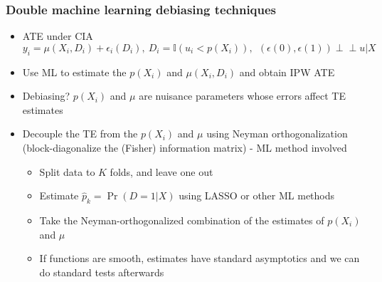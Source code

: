 \documentclass[aspectratio=169]{beamer}
\begin{document}
\begin{frame}
\frametitle{Double machine learning debiasing techniques}
\begin{itemize}
\item ATE under CIA
\[
y_ i = \mu(X_i, D_i)+\epsilon_i(D_i), \ D_i=\mathbb{I}(u_i<p(X_i)), \ \ (\epsilon(0), \epsilon(1))\perp\!\!\perp u|X
\]
\item Use ML to estimate the $p(X_i)$ and $\mu(X_i, D_i)$ and obtain IPW ATE
\item Debiasing? $p(X_i)$ and $\mu$ are nuisance parameters whose errors affect TE estimates
\item Decouple the TE from the $p(X_i)$ and $\mu$ using Neyman orthogonalization (block-diagonalize the (Fisher) information matrix) - ML method involved
\begin{itemize}
\item Split data to $K$ folds, and leave one out
\item Estimate $\hat{p}_k=\Pr(D=1|X)$ using LASSO or other ML methods
\item Take the Neyman-orthogonalized combination of the estimates of $p(X_i)$ and $\mu$
\item If functions are smooth, estimates have standard asymptotics and we can do standard tests afterwards
\end{itemize}
\end{itemize}
\end{frame}
\end{document}
